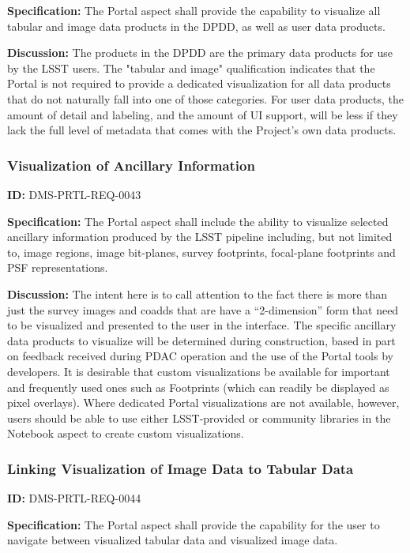 \documentclass[SE,toc]{lsstdoc}
\begin{document}
\textbf{Specification:}
The Portal aspect shall provide the capability to visualize all tabular and image data products in the DPDD, as well as user data products.

\textbf{Discussion:}
The products in the DPDD are the primary data products for use by the LSST users.  The "tabular and image" qualification indicates that the Portal is not required to provide a dedicated visualization for all data products that do not naturally fall into one of those categories.
For user data products, the amount of detail and labeling, and the amount of UI support, will be less if they lack the full level of metadata that comes with the Project's own data products.

\subsubsection{Visualization of Ancillary Information}

\label{DMS-PRTL-REQ-0043}
\textbf{ID:} DMS-PRTL-REQ-0043

\textbf{Specification:}
The Portal aspect shall include the ability to visualize selected ancillary information produced by the LSST pipeline including, but not limited to, image regions, image bit-planes, survey footprints, focal-plane footprints and PSF representations.

\textbf{Discussion:}
The intent here is to call attention to the fact there is more than just the survey images and coadds that are have a “2-dimension” form that need to be visualized and presented to the user in the interface.
The specific ancillary data products to visualize will be determined during construction, based in part on feedback received during PDAC operation and the use of the Portal tools by developers.
It is desirable that custom visualizations be available for important and frequently used ones such as Footprints (which can readily be displayed as pixel overlays).  Where dedicated Portal visualizations are not available, however, users should be able to use either LSST-provided or community libraries in the Notebook aspect to create custom visualizations.

\subsubsection{Linking Visualization of Image Data to Tabular Data}

\label{DMS-PRTL-REQ-0044}
\textbf{ID:} DMS-PRTL-REQ-0044

\textbf{Specification:}
The Portal aspect shall provide the capability for the user to navigate between visualized tabular data and visualized image data.
\end{document}
